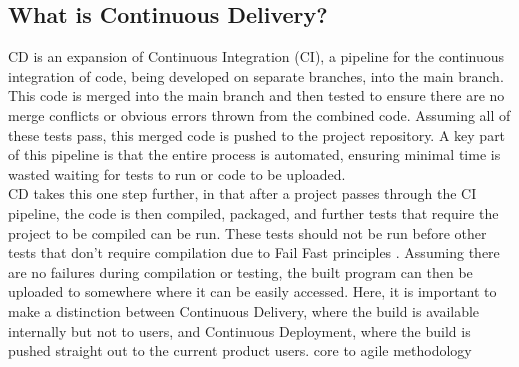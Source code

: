 \documentclass[lettersize,journal]{IEEEtran}
\begin{document}
    \subsection{What is Continuous Delivery?}
        CD is an expansion of Continuous Integration (CI), a pipeline for the continuous integration of code, being developed on separate branches, into the main branch. This code is merged into the main branch and then tested to ensure there are no merge conflicts or obvious errors thrown from the combined code. Assuming all of these tests pass, this merged code is pushed to the project repository. A key part of this pipeline is that the entire process is automated, ensuring minimal time is wasted waiting for tests to run or code to be uploaded. \cite{ContDelIntro,CICDCD} \\
        CD takes this one step further, in that after a project passes through the CI pipeline, the code is then compiled, packaged, and further tests that require the project to be compiled can be run. These tests should not be run before other tests that don't require compilation due to Fail Fast principles \cite{shore2004fail,bamboo}. Assuming there are no failures during compilation or testing, the built program can then be uploaded to somewhere where it can be easily accessed. Here, it is important to make a distinction between Continuous Delivery, where the build is available internally but not to users, and Continuous Deployment, where the build is pushed straight out to the current product users.
        core to agile methodology \cite{agilemanifesto}
\end{document}
